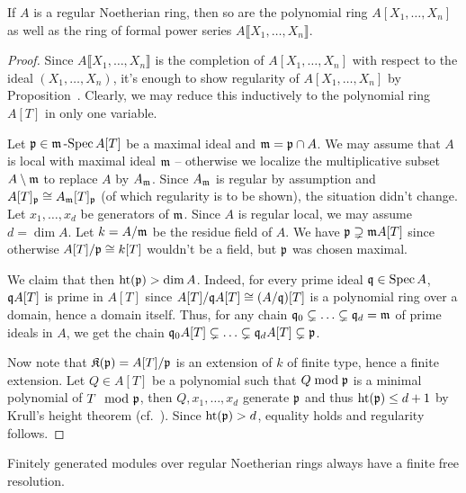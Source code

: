 \documentclass[a4paper,parskip=half,numbers=enddot, DIV=12]{scrreprt}
\begin{document}
\begin{prop}
	If $A$ is a regular Noetherian ring, then so are the polynomial ring $A[X_1,\ldots,X_n]$ as well as the ring of formal power series $A\llbracket X_1,\ldots,X_n\rrbracket$.
\end{prop}
\begin{proof}
	Since $A\llbracket X_1,\ldots,X_n\rrbracket$ is the completion of $A[X_1,\ldots,X_n]$ with respect to the ideal $(X_1,\ldots,X_n)$, it's enough to show regularity of $A[X_1,\ldots,X_n]$ by Proposition~. Clearly, we may reduce this inductively to the polynomial ring $A[T]$ in only one variable. 
	
	Let $\mathfrak{p}\in\mathfrak{m}\operatorname{-Spec} A[T]$ be a maximal ideal and $\mathfrak{m}=\mathfrak{p}\cap A$. We may assume that $A$ is local with maximal ideal $\mathfrak{m}$ -- otherwise we localize the multiplicative subset $A\setminus \mathfrak{m}$ to replace $A$ by $A_{\mathfrak{m}}$. Since $A_{\mathfrak{m}}$ is regular by assumption and $A[T]_{\mathfrak{p}}\cong A_{\mathfrak{m}}[T]_{\mathfrak{p}}$ (of which regularity is to be shown), the situation didn't change. Let $x_1,\ldots,x_d$ be generators of $\mathfrak{m}$. Since $A$ is regular local, we may assume $d=\dim A$. Let $k=A/\mathfrak{m}$ be the residue field of $A$. We have $\mathfrak{p}\supsetneq \mathfrak{m} A[T]$ since otherwise $A[T]/\mathfrak{p}\cong k[T]$ wouldn't be a field, but $\mathfrak{p}$ was chosen maximal. %
	
	We claim that then $\operatorname{ht}(\mathfrak{p})>\dim A$. Indeed, for every prime ideal $\mathfrak{q}\in\operatorname{Spec} A$, $\mathfrak{q} A[T]$ is prime in $A[T]$ since $A[T]/\mathfrak{q} A[T]\cong (A/\mathfrak{q})[T]$ is a polynomial ring over a domain, hence a domain itself. Thus, for any chain $\mathfrak{q}_0\subsetneq \ldots\subsetneq \mathfrak{q}_d=\mathfrak{m}$ of prime ideals in $A$, we get the chain $\mathfrak{q}_0 A[T]\subsetneq \ldots\subsetneq \mathfrak{q}_d A[T]\subsetneq \mathfrak{p}$.
	
	Now note that $\mathfrak{K}(\mathfrak{p})=A[T]/\mathfrak{p}$ is an extension of $k$ of finite type, hence a finite extension. Let $Q\in A[T]$ be a polynomial such that $Q\bmod \mathfrak{p}$ is a minimal polynomial of $T\mod{\mathfrak{p}}$, then $Q,x_1,\ldots,x_d$ generate $\mathfrak{p}$ and thus $\operatorname{ht}(\mathfrak{p})\leq d+1$ by Krull's height theorem (cf.\ \cite[Theorem~12]{alg2}). Since $\operatorname{ht}(\mathfrak{p})>d$, equality holds and regularity follows.
\end{proof}
\begin{prop}
	Finitely generated modules over regular Noetherian rings always have a finite free resolution.
\end{prop}
\end{document}
